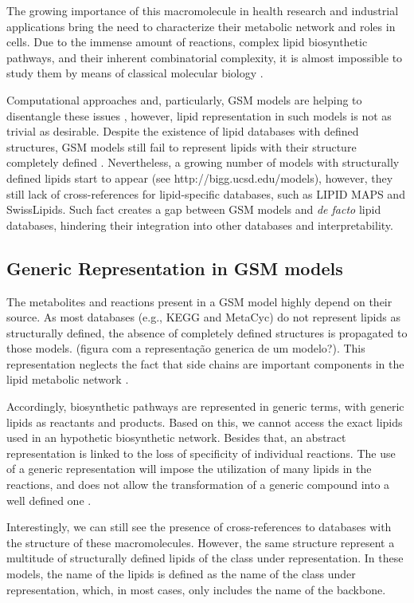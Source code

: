 \documentclass{llncs}
\begin{document}
The growing importance of this macromolecule in health research and industrial applications bring the need to characterize their metabolic network and roles in cells.
Due to the immense amount of reactions, complex lipid biosynthetic pathways, and their inherent combinatorial complexity, it is almost impossible to study them by means of classical molecular biology \cite{Schutzhold}.

Computational approaches and, particularly, GSM models are helping to disentangle these issues \cite{Schutzhold}, however, lipid representation in such models is not as trivial as desirable.
Despite the existence of lipid databases with defined structures, GSM models still fail to represent lipids with their structure completely defined \cite{Aung2013}. Nevertheless, a growing number of models with structurally defined lipids start to appear (see http://bigg.ucsd.edu/models), however, they still lack of cross-references for lipid-specific databases, such as LIPID MAPS and SwissLipids. Such fact creates a gap between GSM models and \textit{de facto} lipid databases, hindering their integration into other databases and interpretability.


\subsection{Generic Representation in GSM models}
The metabolites and reactions present in a GSM model highly depend on their source. As most databases (e.g., KEGG and MetaCyc) do not represent lipids as structurally defined, the absence of completely defined structures is propagated to those models. (figura com a representação generica de um modelo?). 
This representation neglects the fact that side chains are important components in the lipid metabolic network \cite{Schutzhold,Aung2013,Sanchez2019}.

Accordingly, biosynthetic pathways are represented in generic terms, with generic lipids as reactants and products.
Based on this, we cannot access the exact lipids used in an hypothetic biosynthetic network.
Besides that, an abstract representation is linked to the loss of specificity of individual reactions. 
The use of a generic representation will impose the utilization of many lipids in the reactions, and does not allow the transformation of a generic compound into a well defined one \cite{Aung2013}.


Interestingly, we can still see the presence of cross-references to databases with the structure of these macromolecules. However, the same structure represent a multitude of structurally defined lipids of the class under representation. In these models, the name of the lipids is defined as the name of the class under representation, which, in most cases, only includes the name of the backbone.
\end{document}
